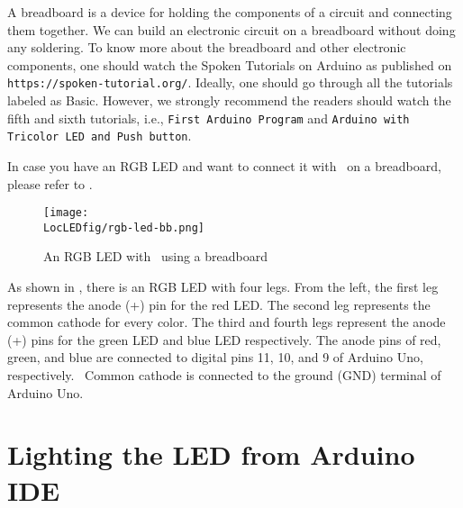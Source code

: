 A breadboard is a device for holding the components of a circuit and connecting 
them together. We can build an electronic circuit on a breadboard without doing any 
soldering. To know more about the breadboard and other electronic components, 
one should watch the Spoken Tutorials on Arduino as published on
{\tt https://spoken-tutorial.org/}. Ideally, one should go through all the
tutorials labeled as Basic. However, we strongly recommend the readers should
watch the fifth and sixth tutorials, i.e., {\tt First Arduino Program} and 
{\tt Arduino with Tricolor LED and Push button}.

In case you have an RGB LED and want to connect it with \arduino\ on a breadboard, 
please refer to . 
\begin{figure}
  \centering
  \texttt{[image: \\LocLEDfig/rgb-led-bb.png]}
  \caption{An RGB LED with \arduino\ using a breadboard}
  \label{fig:ard-rgb-bread}
\end{figure}
As shown in , there is an RGB LED with four legs. 
From the left, the first leg represents the anode (+) pin for the red LED. 
The second leg represents the common cathode for every color. 
The third and fourth legs represent the anode (+) pins for the green LED and blue LED respectively. 
The anode pins of red, green, and blue are connected to digital pins 11, 10, and 9 of Arduino Uno, respectively. 
Common cathode is connected to the ground (GND) terminal of Arduino Uno. 

\section{Lighting the LED from Arduino IDE}


